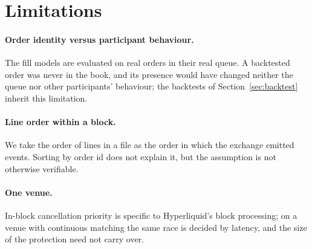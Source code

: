 \section{Limitations}
\label{sec:limitations}

\paragraph{Order identity versus participant behaviour.} The fill models are
evaluated on real orders in their real queue. A backtested order was never in the
book, and its presence would have changed neither the queue nor other
participants' behaviour; the backtests of Section~\ref{sec:backtest} inherit
this limitation.

\paragraph{Line order within a block.} We take the order of lines in a file as
the order in which the exchange emitted events. Sorting by order id does not
explain it, but the assumption is not otherwise verifiable.

\paragraph{One venue.} In-block cancellation priority is specific to
Hyperliquid's block processing; on a venue with continuous matching the same race
is decided by latency, and the size of the protection need not carry over.
